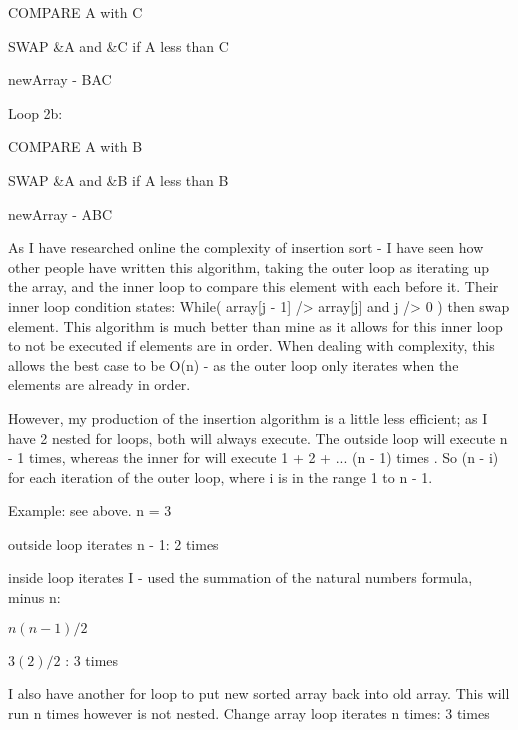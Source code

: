 \documentclass{article}
\begin{document}
			COMPARE A with C\newline

			SWAP \&A and \&C if A less than  C\newline

			newArray - BAC\newline

		Loop 2b:\newline

			COMPARE A with B\newline

			SWAP \&A and \&B if A less than  B\newline

			newArray - ABC\newline


As I have researched online the complexity of insertion sort - I have seen how other people have written this algorithm, taking the outer loop as iterating up the array, and the inner loop to compare this element with each before it. Their inner loop condition states: While( array[j - 1] /> array[j] and j /> 0 ) then swap element. This algorithm is much better than mine as it allows for this inner loop to not be executed if elements are in order. When dealing with complexity, this allows the best case to be O(n) - as the outer loop only iterates when the elements are already in order.\par

However, my production of the insertion algorithm is a little less efficient; as I have 2 nested for loops, both will always execute. The outside loop will execute n - 1 times, whereas the inner for will execute {1 + 2 + ... (n - 1)} times . So (n - i) for each iteration of the outer loop, where i is in the range 1 to n - 1.\par

Example: see above. n = 3\newline

 outside loop iterates n - 1: 2 times\newline

 inside  loop iterates I - used the summation of the natural numbers\newline
 formula, minus n:\newline

  			$n(n - 1) / 2$\newline

				$3(2) / 2$            : 3 times\newline


I also have another for loop to put new sorted array back into old array. This will run n times however is not nested.
	Change array loop iterates n times: 3 times\newline
\end{document}
